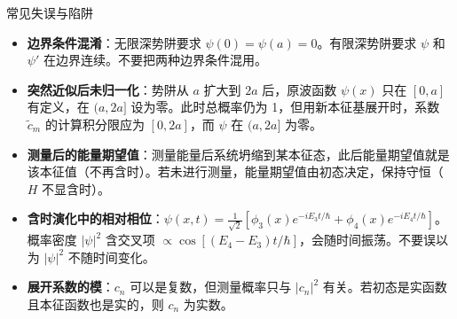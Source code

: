 \begin{errorbox}{常见失误与陷阱}
\begin{itemize}
    \item \textbf{边界条件混淆}：无限深势阱要求 $\psi(0)=\psi(a)=0$。有限深势阱要求 $\psi$ 和 $\psi'$ 在边界连续。不要把两种边界条件混用。
    \item \textbf{突然近似后未归一化}：势阱从 $a$ 扩大到 $2a$ 后，原波函数 $\psi(x)$ 只在 $[0,a]$ 有定义，在 $(a,2a]$ 设为零。此时总概率仍为 1，但用新本征基展开时，系数 $\tilde{c}_m$ 的计算积分限应为 $[0,2a]$，而 $\psi$ 在 $(a,2a]$ 为零。
    \item \textbf{测量后的能量期望值}：测量能量后系统坍缩到某本征态，此后能量期望值就是该本征值（不再含时）。若未进行测量，能量期望值由初态决定，保持守恒（$H$ 不显含时）。
    \item \textbf{含时演化中的相对相位}：$\psi(x,t)=\frac{1}{\sqrt{2}}[\phi_3(x)e^{-iE_3t/\hbar}+\phi_4(x)e^{-iE_4t/\hbar}]$。概率密度 $|\psi|^2$ 含交叉项 $\propto\cos[(E_4-E_3)t/\hbar]$，会随时间振荡。不要误以为 $|\psi|^2$ 不随时间变化。
    \item \textbf{展开系数的模}：$c_n$ 可以是复数，但测量概率只与 $|c_n|^2$ 有关。若初态是实函数且本征函数也是实的，则 $c_n$ 为实数。
\end{itemize}
\end{errorbox}

